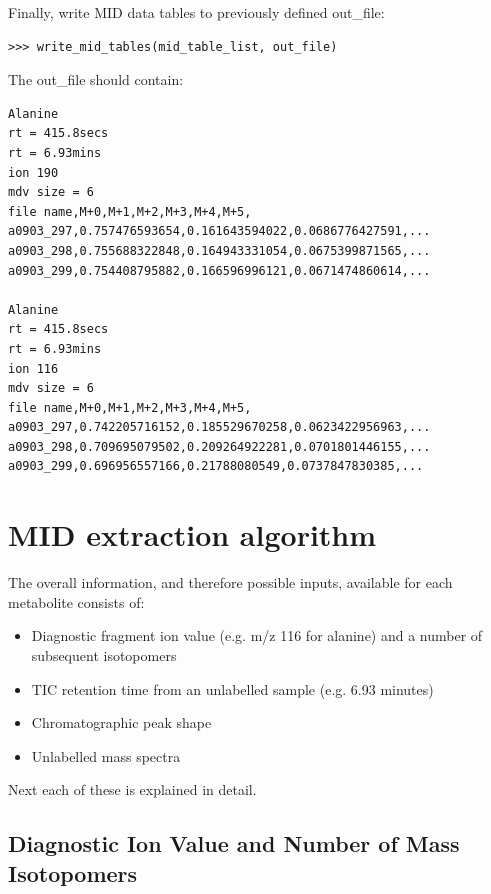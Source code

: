 Finally, write MID data tables to previously defined out\_file:

\begin{verbatim}
>>> write_mid_tables(mid_table_list, out_file)
\end{verbatim}

The out\_file should contain:

\begin{verbatim}
Alanine
rt = 415.8secs
rt = 6.93mins
ion 190
mdv size = 6
file name,M+0,M+1,M+2,M+3,M+4,M+5,
a0903_297,0.757476593654,0.161643594022,0.0686776427591,...
a0903_298,0.755688322848,0.164943331054,0.0675399871565,...
a0903_299,0.754408795882,0.166596996121,0.0671474860614,...

Alanine
rt = 415.8secs
rt = 6.93mins
ion 116
mdv size = 6
file name,M+0,M+1,M+2,M+3,M+4,M+5,
a0903_297,0.742205716152,0.185529670258,0.0623422956963,...
a0903_298,0.709695079502,0.209264922281,0.0701801446155,...
a0903_299,0.696956557166,0.21788080549,0.0737847830385,...
\end{verbatim}

\section
{MID extraction algorithm}

\noindent

The overall information, and therefore possible inputs, available for each
metabolite consists of:

\begin{itemize}
\item Diagnostic fragment ion value (e.g. m/z 116 for alanine) and a number
of subsequent isotopomers
\item TIC retention time from an unlabelled sample (e.g. 6.93 minutes)
\item Chromatographic peak shape
\item Unlabelled mass spectra
\end{itemize}

Next each of these is explained in detail.

\subsection{Diagnostic Ion Value and Number of Mass Isotopomers}

